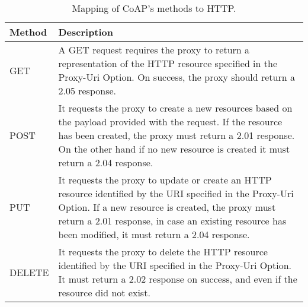 	\begin{table}[h!]
		\begin{center}
			\begin{tabularx}{\textwidth}{|l|X|}
				\hline
				\textbf{Method} & \textbf{Description} \\\hline
				GET & A GET request requires the proxy to return a representation of the HTTP resource specified in the Proxy-Uri Option.
				On success, the proxy should return a 2.05 response.\\\hline
				POST & It requests the proxy to create a new resources based on the payload provided with the request.
				If the resource has been created, the proxy must return a 2.01 response.
				On the other hand if no new resource is created it must return a 2.04 response.\\\hline
				PUT & It requests the proxy to update or create an HTTP resource identified by the URI specified in the Proxy-Uri Option.
				If a new resource is created, the proxy must return a 2.01 response, in case an existing resource has been modified, it must return a 2.04 response.\\\hline
				DELETE & It requests the proxy to delete the HTTP resource identified by the URI specified in the Proxy-Uri Option.
				It must return a 2.02 response on success, and even if the resource did not exist.\\\hline
			\end{tabularx}
			\caption{Mapping of CoAP's methods to HTTP.}
			\label{tab:table8}
		\end{center}
	\end{table}